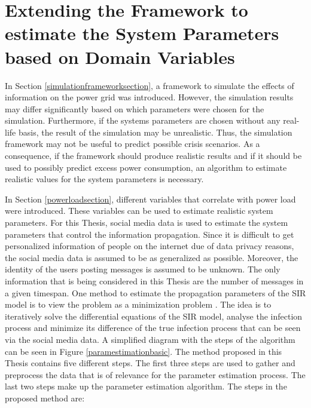 \section{Extending the Framework to estimate the System Parameters based on
Domain Variables}
\label{parameterestimationalgo}

In Section \ref{simulationframeworksection}, a framework to simulate the effects 
of information on the power grid was introduced. However, the simulation results
may differ significantly based on which parameters were chosen for the simulation.
Furthermore, if the systems parameters are chosen without any real-life basis,
the result of the simulation may be unrealistic. Thus, the simulation framework 
may not be useful to predict possible crisis scenarios.
As a consequence, if the framework should produce realistic results and if
it should be used to possibly predict excess power consumption, an 
algorithm to estimate realistic values for the system parameters is necessary.

In Section \ref{powerloadsection}, different variables that 
correlate with power load were introduced. These variables can be 
used to estimate realistic system parameters. For this Thesis, social media data is 
used to estimate the system parameters that control the 
information propagation. Since it is difficult to get personalized 
information of people on the internet due of data privacy reasons, the
social media data is assumed to be as generalized as possible. Moreover, the identity 
of the users posting messages is assumed to be unknown. The only information
that is being considered in this Thesis are the number of messages in a given timespan.
One method to estimate the propagation parameters of the SIR model 
is to view the problem as a minimization problem 
\cite{jin2013epidemiological}. The idea is to iteratively solve the differential 
equations of the SIR model, analyse the infection process and minimize 
its difference of the true infection process that can be seen via the
social media data. A simplified diagram with the steps of the algorithm
can be seen in Figure \ref{paramestimationbasic}. The method proposed 
in this Thesis contains five different steps. 
The first three steps are used to gather and preprocess 
the data that is of relevance for the parameter estimation process.
The last two steps make up the parameter estimation algorithm.
The steps in the proposed method are:

